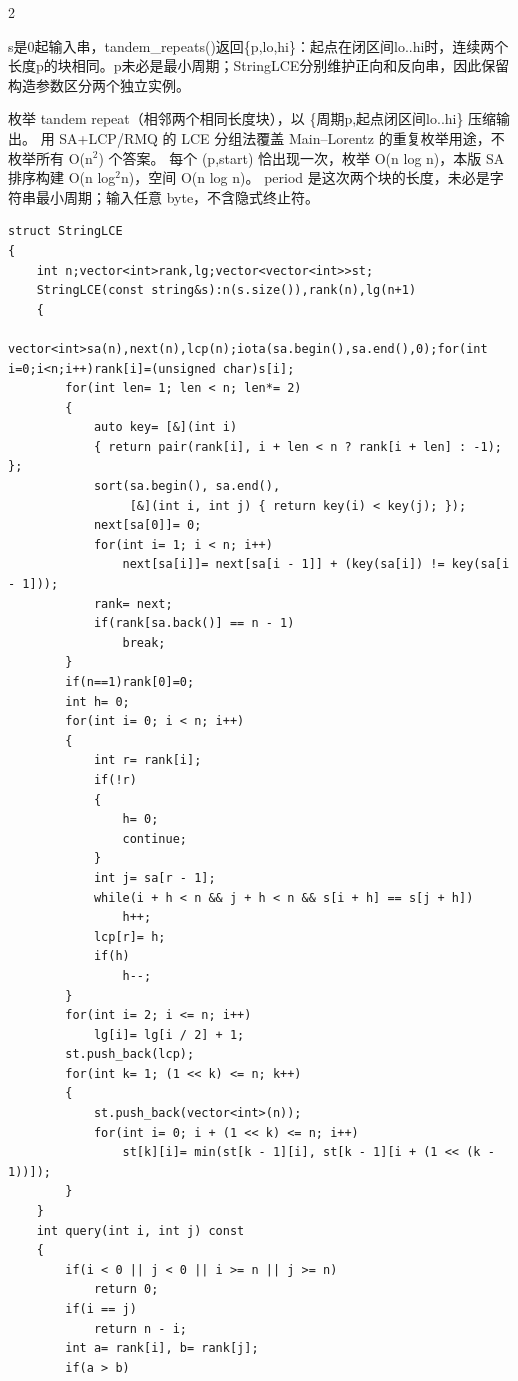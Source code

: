 \documentclass[UTF8,fontset=fandol,a4paper,twoside]{ctexart}
\newcommand{\note}[1]{{\fontsize{10}{12}\selectfont #1\par}}
\begin{document}
\begin{multicols}{2}
\note{s是0起输入串，tandem\_repeats(\allowbreak{})\allowbreak{}返回\{p,\allowbreak{}lo,\allowbreak{}hi\}：起点在闭区间lo.\allowbreak{}.\allowbreak{}hi时，连续两个长度p的块相同。p未必是最小周期；StringLCE分别维护正向和反向串，因此保留构造参数区分两个独立实例。}
\note{枚举 tandem repeat（相邻两个相同长度块），以 \{周期p,\allowbreak{}起点闭区间lo.\allowbreak{}.\allowbreak{}hi\} 压缩输出。 用 SA+\allowbreak{}LCP/\allowbreak{}RMQ 的 LCE 分组法覆盖 Main–Lorentz 的重复枚举用途，不枚举所有 O(\allowbreak{}n\ensuremath{^2})\allowbreak{} 个答案。 每个 (\allowbreak{}p,\allowbreak{}start)\allowbreak{} 恰出现一次，枚举 O(\allowbreak{}n log n)\allowbreak{}，本版 SA 排序构建 O(\allowbreak{}n log\ensuremath{^2}n)\allowbreak{}，空间 O(\allowbreak{}n log n)\allowbreak{}。 period 是这次两个块的长度，未必是字符串最小周期；输入任意 byte，不含隐式终止符。}
\begin{lstlisting}
struct StringLCE
{
    int n;vector<int>rank,lg;vector<vector<int>>st;
    StringLCE(const string&s):n(s.size()),rank(n),lg(n+1)
    {
        vector<int>sa(n),next(n),lcp(n);iota(sa.begin(),sa.end(),0);for(int i=0;i<n;i++)rank[i]=(unsigned char)s[i];
        for(int len= 1; len < n; len*= 2)
        {
            auto key= [&](int i)
            { return pair(rank[i], i + len < n ? rank[i + len] : -1); };
            sort(sa.begin(), sa.end(),
                 [&](int i, int j) { return key(i) < key(j); });
            next[sa[0]]= 0;
            for(int i= 1; i < n; i++)
                next[sa[i]]= next[sa[i - 1]] + (key(sa[i]) != key(sa[i - 1]));
            rank= next;
            if(rank[sa.back()] == n - 1)
                break;
        }
        if(n==1)rank[0]=0;
        int h= 0;
        for(int i= 0; i < n; i++)
        {
            int r= rank[i];
            if(!r)
            {
                h= 0;
                continue;
            }
            int j= sa[r - 1];
            while(i + h < n && j + h < n && s[i + h] == s[j + h])
                h++;
            lcp[r]= h;
            if(h)
                h--;
        }
        for(int i= 2; i <= n; i++)
            lg[i]= lg[i / 2] + 1;
        st.push_back(lcp);
        for(int k= 1; (1 << k) <= n; k++)
        {
            st.push_back(vector<int>(n));
            for(int i= 0; i + (1 << k) <= n; i++)
                st[k][i]= min(st[k - 1][i], st[k - 1][i + (1 << (k - 1))]);
        }
    }
    int query(int i, int j) const
    {
        if(i < 0 || j < 0 || i >= n || j >= n)
            return 0;
        if(i == j)
            return n - i;
        int a= rank[i], b= rank[j];
        if(a > b)

\end{lstlisting}
\end{multicols}
\end{document}

